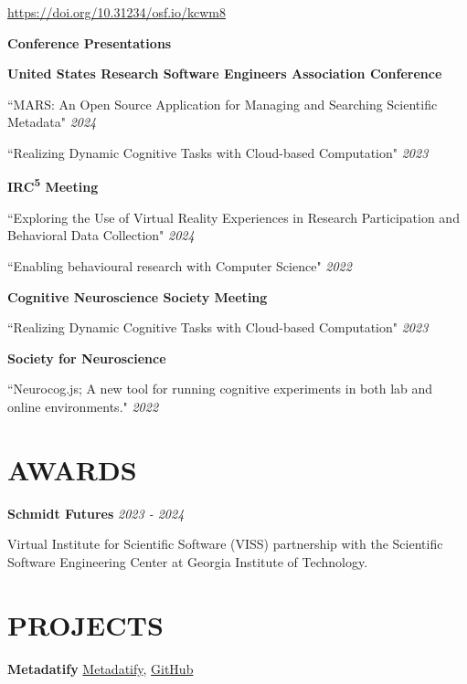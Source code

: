 \documentclass{article}
\begin{document}
  \href{https://doi.org/10.31234/osf.io/kcwm8}{https://doi.org/10.31234/osf.io/kcwm8}

  \smallbreak

  {\large\textbf{Conference Presentations}}

  \textbf{United States Research Software Engineers Association Conference}

  ``MARS: An Open Source Application for Managing and Searching Scientific Metadata" \hfill \textit{2024}

  ``Realizing Dynamic Cognitive Tasks with Cloud-based Computation" \hfill \textit{2023}

  \smallbreak

  \textbf{IRC\textsuperscript{5} Meeting}

 ``Exploring the Use of Virtual Reality Experiences in Research Participation and Behavioral Data Collection" \hfill \textit{2024}

 ``Enabling behavioural research with Computer Science" \hfill \textit{2022}

  \smallbreak

  \textbf{Cognitive Neuroscience Society Meeting}

  ``Realizing Dynamic Cognitive Tasks with Cloud-based Computation" \hfill \textit{2023}

  \smallbreak

  \textbf{Society for Neuroscience}

  ``Neurocog.js; A new tool for running cognitive experiments in both lab and online environments." \hfill \textit{2022}

  \section*{\centering\uppercase{Awards}}

  \textbf{Schmidt Futures} \hfill \textit{2023 - 2024}

  Virtual Institute for Scientific Software (VISS) partnership with the Scientific Software Engineering Center at Georgia Institute of Technology.

  \section*{\centering\uppercase{Projects}}

  \textbf{Metadatify} \hfill \href{https://metadatify.com}{Metadatify}, \href{https://github.com/Brain-Development-and-Disorders-Lab/mars}{GitHub}
\end{document}
